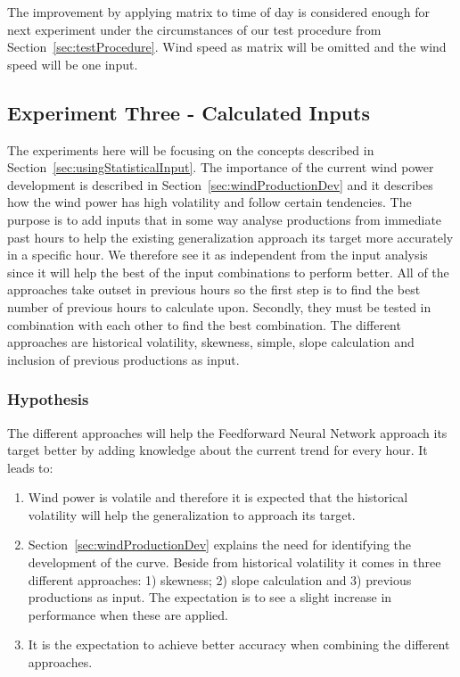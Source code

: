 The improvement by applying matrix to time of day is considered enough for next experiment under the circumstances of our test procedure from Section~\ref{sec:testProcedure}. Wind speed as matrix will be omitted and the wind speed will be one input.

\newpage

\subsection{Experiment Three - Calculated Inputs}
\label{sec:experimentThreeCalcInputs}
The experiments here will be focusing on the concepts described in Section~\ref{sec:usingStatisticalInput}. The importance of the current wind power development is described in Section~\ref{sec:windProductionDev} and it describes how the wind power has high volatility and follow certain tendencies. The purpose is to add inputs that in some way analyse productions from immediate past hours to help the existing generalization approach its target more accurately in a specific hour. We therefore see it as independent from the input analysis since it will help the best of the input combinations to perform better. All of the approaches take outset in previous hours so the first step is to find the best number of previous hours to calculate upon. Secondly, they must be tested in combination with each other to find the best combination. The different approaches are historical volatility, skewness, simple, slope calculation and inclusion of previous productions as input. 

\subsubsection{Hypothesis} 
The different approaches will help the Feedforward Neural Network approach its target better by adding knowledge about the current trend for every hour. It leads to: 

\begin{enumerate}
\item Wind power is volatile and therefore it is expected that the historical volatility will help the generalization to approach its target.
\item Section~\ref{sec:windProductionDev} explains the need for identifying the development of the curve. Beside from historical volatility it comes in three different approaches: 1) skewness; 2) slope calculation and 3) previous productions as input. The expectation is to see a slight increase in performance when these are applied.
\item It is the expectation to achieve better accuracy when combining the different approaches.
\end{enumerate}

